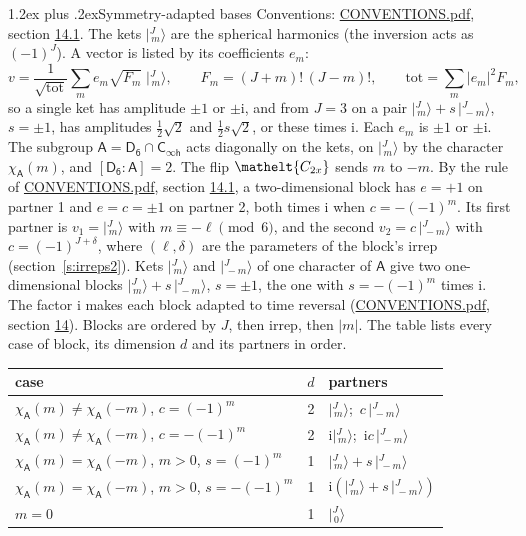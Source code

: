 \documentclass[10pt,a4paper]{article}
\makeatletter
\renewcommand\section{\@startsection{section}{1}{\z@}{-3ex plus -1ex minus -.2ex}%
  {1.2ex plus .2ex}{\normalfont\large\sffamily\bfseries\color{parttitle}}}
\numberwithin{equation}{section}
\newcommand{\eltfont}[1]{{\let\sigma\eltsigma\mathelt{#1}}}
\newcommand{\grp}[1]{\mathsf{#1}}
\newcommand{\elt}[1]{\eltfont{#1}}
\newcommand{\grpindex}[2]{[#1 : #2]}
\newcommand{\iunit}{\mathrm{i}}
\newcommand{\chiA}{\chi_{\grp{A}}}
\newcommand{\jm}[2]{\bigl\lvert{}^{#1}_{\,#2}\bigr\rangle}
\makeatother
\begin{document}
\section{Symmetry-adapted bases}\label{s:bases}
Conventions: \href{../../CONVENTIONS.pdf}{CONVENTIONS.pdf}, section \href{../../CONVENTIONS.pdf\#conv.14.1}{14.1}.
\leavevmode\label{n:index.m}\label{n:vector.ket}The kets $\jm{J}{m}$ are the spherical harmonics (the inversion acts as $(-1)^J$). \label{n:index.ketcoefficient}\label{n:vector.basis.symmetry}\label{n:index.ketweight}\label{n:index.total}A vector is listed by its coefficients $e_m$:
\begin{equation}\label{e:ket}v = \frac{1}{\sqrt{\mathrm{tot}}}\sum_m e_m\sqrt{F_m}\;\jm{J}{m},\qquad F_m = (J+m)!\,(J-m)!,\qquad \mathrm{tot} = \sum_m |e_m|^2F_m,\end{equation}
\leavevmode\label{n:index.pair.sign}so a single ket has amplitude $\pm1$ or $\pm\iunit$, and from $J = 3$ on a pair $\jm{J}{m} + s\,\jm{J}{-m}$, $s = \pm1$, has amplitudes $\tfrac{1}{2}\sqrt{2}$ and $\tfrac{1}{2}s\sqrt{2}$, or these times $\iunit$. Each $e_m$ is $\pm1$ or $\pm\iunit$.
\leavevmode\label{n:group.A}\label{n:function.character.abelian}The subgroup $\grp{A} = \grp{D_{6}}\cap\grp{C_{\infty h}}$ acts diagonally on the kets, on $\jm{J}{m}$ by the character $\chiA(m)$, and $\grpindex{\grp{D_{6}}}{\grp{A}} = 2$. The flip $\elt{C_{2x}}$ sends $m$ to $-m$. \label{n:index.partner.sign}By the rule of \href{../../CONVENTIONS.pdf}{CONVENTIONS.pdf}, section \href{../../CONVENTIONS.pdf\#conv.14.1}{14.1}, a two-dimensional block has $e = +1$ on partner 1 and $e = c = \pm1$ on partner 2, both times $\iunit$ when $c = -(-1)^m$. Its first partner is $v_1 = \jm{J}{m}$ with $m \equiv -\ell \pmod{6}$, and the second $v_2 = c\,\jm{J}{-m}$ with $c = (-1)^{J+\delta}$, where $(\ell, \delta)$ are the parameters of the block's irrep (section~\ref{s:irreps2}). Kets $\jm{J}{m}$ and $\jm{J}{-m}$ of one character of $\grp{A}$ give two one-dimensional blocks $\jm{J}{m} + s\,\jm{J}{-m}$, $s = \pm1$, the one with $s = -(-1)^m$ times $\iunit$. The factor $\iunit$ makes each block adapted to time reversal (\href{../../CONVENTIONS.pdf}{CONVENTIONS.pdf}, section \href{../../CONVENTIONS.pdf\#conv.14}{14}). Blocks are ordered by $J$, then irrep, then $|m|$.
\leavevmode\label{n:head.case}\label{n:head.partners}The table lists every case of block, its dimension $d$ and its partners in order.
\begin{center}\begin{tabular}{@{}lrl@{}}\toprule
case & $d$ & partners\\\midrule
$\chiA(m) \ne \chiA(-m)$, $c = (-1)^m$ & 2 & $\jm{J}{m}$;\ $c\,\jm{J}{-m}$\\
$\chiA(m) \ne \chiA(-m)$, $c = -(-1)^m$ & 2 & $\iunit\jm{J}{m}$;\ $\iunit c\,\jm{J}{-m}$\\
$\chiA(m) = \chiA(-m)$, $m > 0$, $s = (-1)^m$ & 1 & $\jm{J}{m} + s\,\jm{J}{-m}$\\
$\chiA(m) = \chiA(-m)$, $m > 0$, $s = -(-1)^m$ & 1 & $\iunit(\jm{J}{m} + s\,\jm{J}{-m})$\\
$m = 0$ & 1 & $\jm{J}{0}$\\
\bottomrule\end{tabular}\end{center}
\end{document}

